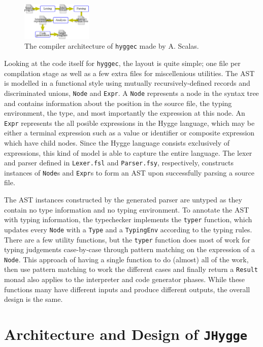 \begin{figure}[H]
\centering
\includegraphics[width=0.3\textwidth]{Pictures/basic_compiler_phases.png}
\caption{The compiler architecture of \texttt{hyggec} made by A. Scalas.}
\label{fig:hyggec_compiler_phases}
\end{figure}

Looking at the code itself for \texttt{hyggec}, the layout is quite simple; one file per compilation stage as well as a few extra
files for miscellenious utilities. The AST is modelled in a functional style using mutually recursively-defined records and discriminated
unions, \texttt{Node} and \texttt{Expr}. A \texttt{Node} represents a node in the syntax tree and contains information about the
position in the source file, the typing environment, the type, and most importantly the expression at this node. An \texttt{Expr}
represents the all posible expressions in the Hygge language, which may be either a terminal expression such as a value or identifier
or composite expression which have child nodes. Since the Hygge language consists exclusively of expressions, this kind of model is
able to capture the entire language. The lexer and parser defined in \texttt{Lexer.fsl} and \texttt{Parser.fsy}, respectively,
constructs instances of \texttt{Node}s and \texttt{Expr}s to form an AST upon successfully parsing a source file.

The AST instances constructed by the generated parser are untyped as they contain no type information and no typing environment.
To annotate the AST with typing information, the typechecker implements the \texttt{typer} function, which updates every \texttt{Node}
with a \texttt{Type} and a \texttt{TypingEnv} according to the typing rules. There are a few utility functions, but the \texttt{typer}
function does most of work for typing judgements case-by-case through pattern matching on the expression of a \texttt{Node}. This
approach of having a single function to do (almost) all of the work, then use pattern matching to work the different cases and
finally return a \texttt{Result} monad also applies to the interpreter and code generator phases. While these functions many have
different inputs and produce different outputs, the overall design is the same.

\section{Architecture and Design of \texttt{JHygge}}

